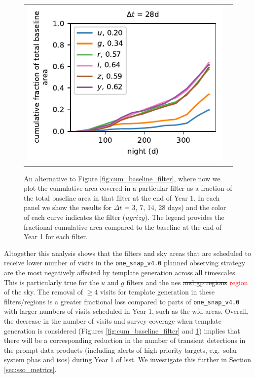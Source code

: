 \documentclass[preprintm,linenumbers]{aastex631}
\newcommand{\baseline}{\texttt{one\_snap\_v4.0}\xspace}
\providecommand{\red}[1]{\textcolor{red}{#1}}
\begin{document}
\begin{figure}
\begin{tabular}{@{}c@{}c@{}}
				\includegraphics{results/first_year_one_snap_v4_0_10yrs_db_noDD_noTwi_cumFrac_baseline_28.pdf}
			\end{tabular}
			\caption{ An alternative to Figure \ref{fig:cum_baseline_filter}, where now we plot the cumulative area covered in a particular filter as a fraction of the total baseline area in that filter at the end of Year 1.
				In each panel we show the results for $\Delta t$ = 3, 7, 14, 28 days) and the color of each curve indicates the filter ($ugrizy$).
				The legend provides the fractional cumulative area compared to the baseline at the end of Year 1 for each filter.
			}
			\label{fig:cumFrac_baseline}
		\end{figure}
  
  Altogether this analysis shows that the filters and sky areas that are scheduled to receive lower number of visits in the \baseline planned observing strategy are the most negatively affected by template generation across all timescales.
  This is particularly true for the $u$ and $g$ filters and the \gls*{nes} \sout{and \gls*{gp} regions} \red{region} of the sky.
  The removal of $\geq4$ visits for template generation in these filters/regions is a greater fractional loss compared to parts of \baseline with larger numbers of visits scheduled in Year 1, such as the \gls*{wfd} areas.
		Overall, the decrease in the number of visits and survey coverage when template generation is considered (Figures \ref{fig:cum_baseline_filter} and \ref{fig:cumFrac_baseline}) implies that there will be a corresponding reduction in the number of transient detections in the prompt data products (including alerts of high priority targets, e.g.\ solar system \glspl*{pha} and \glspl*{iso}) during Year 1 of \gls*{lsst}.
  We investigate this further in Section \ref{sec:sso_metrics}.
		\\
\end{document}
